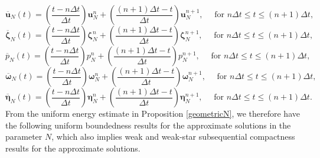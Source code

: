 \documentclass[11pt]{article}
\newcommand{\bd}{\boldsymbol}
\theoremstyle{definition}
\begin{document}
\begin{equation*}
\overline{\bd{u}}_{N}(t) = \left(\frac{t - n\Delta t}{\Delta t}\right) \bd{u}^{n}_{N} + \left(\frac{(n + 1)\Delta t - t}{\Delta t}\right) \bd{u}^{n + 1}_{N}, \quad \text{ for } n\Delta t \le t \le (n + 1)\Delta t,
\end{equation*}
\begin{equation*}
\bd{\overline{\zeta}}_{N}(t) = \left(\frac{t - n\Delta t}{\Delta t}\right) \bd{\zeta}^{n}_{N} + \left(\frac{(n + 1)\Delta t - t}{\Delta t}\right) \bd{\zeta}^{n + 1}_{N}, \quad \text{ for } n\Delta t \le t \le (n + 1)\Delta t,
\end{equation*}
\begin{equation*}
\overline{p}_{N}(t) = \left(\frac{t - n\Delta t}{\Delta t}\right) p^{n}_{N} + \left(\frac{(n + 1)\Delta t - t}{\Delta t}\right) p^{n + 1}_{N}, \quad \text{ for } n\Delta t \le t \le (n + 1)\Delta t,
\end{equation*}
\begin{equation*}
\overline{\bd{\omega}}_{N}(t) = \left(\frac{t - n\Delta t}{\Delta t}\right) \bd{\omega}^{n}_{N} + \left(\frac{(n + 1)\Delta t - t}{\Delta t}\right) \bd{\omega}^{n + 1}_{N}, \quad \text{ for } n\Delta t \le t \le (n + 1)\Delta t,
\end{equation*}
\begin{equation*}
\overline{\bd{\eta}}_{N}(t) = \left(\frac{t - n\Delta t}{\Delta t}\right) \bd{\eta}^{n}_{N} + \left(\frac{(n + 1)\Delta t - t}{\Delta t}\right) \bd{\eta}^{n + 1}_{N}, \quad \text{ for } n\Delta t \le t \le (n + 1)\Delta t.
\end{equation*}
From the uniform energy estimate in Proposition \ref{geometricN}, we therefore have the following uniform boundedness results for the approximate solutions in the parameter $N$, which also implies weak and weak-star subsequential compactness results for the approximate solutions.
\end{document}
